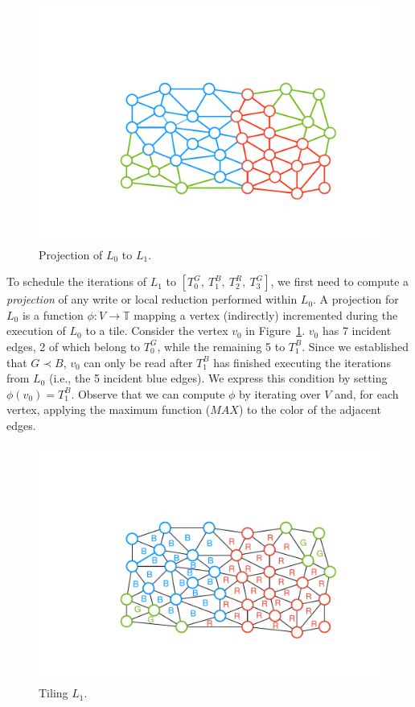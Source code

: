 \begin{figure}[h]
\centering
\includegraphics[width=\textwidth]{sparsetiling/figures/loop_0_with_vertices.pdf}
\caption{Projection of $L_0$ to $L_1$.}
\label{fig:st-loop-0-proj}
\end{figure}

To schedule the iterations of $L_1$ to $[T_0^G,\ T_1^B,\ T_2^R,\ T_3^G]$, we first need to compute a \textit{projection} of any write or local reduction performed within $L_0$.  A projection for $L_0$ is a function $\phi : V \rightarrow \mathbb{T}$ mapping a vertex (indirectly) incremented during the execution of $L_0$ to a tile. Consider the vertex $v_0$ in Figure~\ref{fig:st-loop-0-proj}. $v_0$ has 7 incident edges, 2 of which belong to $T_0^G$, while the remaining 5 to $T_1^B$. Since we established that $G \prec B$, $v_0$ can only be read after $T_1^B$ has finished executing the iterations from $L_0$ (i.e., the 5 incident blue edges). We express this condition by setting $\phi(v_0) = T_1^B$. Observe that we can compute $\phi$ by iterating over $V$ and, for each vertex, applying the maximum function ($MAX$) to the color of the adjacent edges. 

\begin{figure}[h]
\centering
\includegraphics[width=\textwidth]{sparsetiling/figures/loop_1.pdf}
\caption{Tiling $L_1$.}
\label{fig:st-loop-1}
\end{figure}

